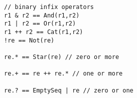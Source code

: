 \begin{lstlisting}[style=reclojureScala]
// binary infix operators
r1 & r2 == And(r1,r2)
r1 | r2 == Or(r1,r2)
r1 ++ r2 == Cat(r1,r2)
!re == Not(re)

re.* == Star(re) // zero or more

re.+ == re ++ re.* // one or more

re.? == EmptySeq | re // zero or one
\end{lstlisting}
